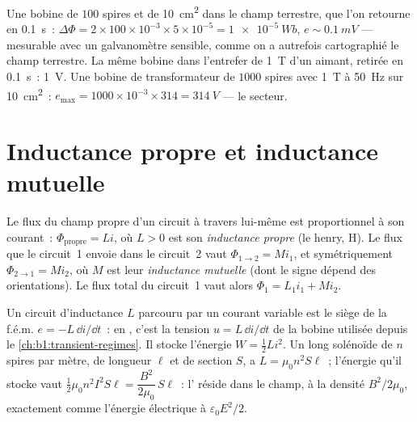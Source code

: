 \begin{example}\label{ex:b1:induction:orders}
Une bobine de $100$ spires et de \qty{10}{cm^2} dans le champ terrestre, que
l'on retourne en \qty{0.1}{s}~: $\Delta\Phi = 2 \times 100 \times 10^{-3} \times 5 \times 10^{-5} = \qty{1e-5}{Wb}$,
$e \sim \qty{0.1}{mV}$ --- mesurable avec un galvanomètre sensible, comme on a
autrefois cartographié le champ terrestre. La même bobine dans l'entrefer de
\qty{1}{T} d'un aimant, retirée en \qty{0.1}{s}~: \qty{1}{V}. Une bobine de
transformateur de $1000$ spires avec \qty{1}{T} à \qty{50}{Hz} sur \qty{10}{cm^2}~: $e_{\max} =
1000 \times 10^{-3} \times 314 = \qty{314}{V}$ --- le secteur.
\end{example}

\section{Inductance propre et inductance mutuelle}

\begin{definition}[Inductance]\label{def:b1:induction:inductance}
Le flux du champ propre d'un circuit à travers lui-même est proportionnel à son
courant~: $\Phi_{\text{propre}} = Li$, où $L > 0$ est son \emph{inductance propre}
(le henry, \unit{H}). Le flux que le circuit~1 envoie dans le circuit~2 vaut
$\Phi_{1 \to 2} = Mi_1$, et symétriquement $\Phi_{2 \to 1} = Mi_2$, où $M$ est
leur \emph{inductance mutuelle} (dont le signe dépend des orientations). Le
flux total du circuit~1 vaut alors $\Phi_1 = L_1i_1 + Mi_2$.
\end{definition}

\begin{proposition}\label{prop:b1:induction:inductor}
Un circuit d'inductance $L$ parcouru par un courant variable est le siège de la
f.é.m. $e = -L\,\dd i/\dd t$~: en , c'est la tension
$u = L\,\dd i/\dd t$ de la bobine utilisée depuis le
\cref{ch:b1:transient-regimes}. Il stocke l'énergie $W = \tfrac12Li^2$.
Un long solénoïde de $n$ spires par mètre, de longueur $\ell$ et de section $S$,
a $L = \mu_0n^2S\ell$~; l'énergie qu'il stocke vaut $\tfrac12\mu_0n^2I^2S\ell =
\dfrac{B^2}{2\mu_0}\,S\ell$~: l' réside dans le champ, à la
densité $B^2/2\mu_0$, exactement comme l'énergie électrique à $\varepsilon_0E^2/2$.
\end{proposition}

